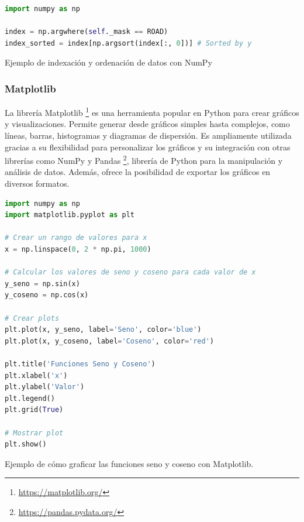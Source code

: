 \begin{code}[h]
\begin{lstlisting}[language=Python]
import numpy as np

index = np.argwhere(self._mask == ROAD)
index_sorted = index[np.argsort(index[:, 0])] # Sorted by y

\end{lstlisting}
\caption[Ejemplo de indexación y ordenación de datos con NumPy]{Ejemplo de indexación y ordenación de datos con NumPy}
\label{cod:numpy}
\end{code}

\subsubsection{Matplotlib}
\label{sec:plot}

La librería Matplotlib \footnote{\url{https://matplotlib.org/}} es una herramienta popular en Python para crear gráficos y visualizaciones. Permite generar desde gráficos simples hasta complejos, como líneas, barras, histogramas y diagramas de dispersión. Es ampliamente utilizada gracias a su flexibilidad para personalizar los gráficos y su integración con otras librerías como NumPy y Pandas \footnote{\url{https://pandas.pydata.org/}}, librería de Python para la manipulación y análisis de datos. Además, ofrece la posibilidad de exportar los gráficos en diversos formatos.

\begin{code}[h]
\begin{lstlisting}[language=Python]
import numpy as np
import matplotlib.pyplot as plt

# Crear un rango de valores para x
x = np.linspace(0, 2 * np.pi, 1000)

# Calcular los valores de seno y coseno para cada valor de x
y_seno = np.sin(x)
y_coseno = np.cos(x)

# Crear plots
plt.plot(x, y_seno, label='Seno', color='blue')
plt.plot(x, y_coseno, label='Coseno', color='red')

plt.title('Funciones Seno y Coseno')
plt.xlabel('x')
plt.ylabel('Valor')
plt.legend()
plt.grid(True)

# Mostrar plot
plt.show()
\end{lstlisting}
\caption[Ejemplo de cómo graficar las funciones seno y coseno con Matplotlib]{Ejemplo de cómo graficar las funciones seno y coseno con Matplotlib.}
\label{cod:plot}
\end{code}

